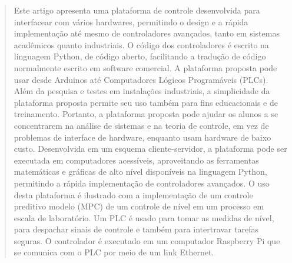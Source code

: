 \begin{quote}
    Este artigo apresenta uma plataforma de controle desenvolvida para
    interfacear com vários hardwares, permitindo o design e a rápida
    implementação até mesmo de controladores avançados, tanto em sistemas
    acadêmicos quanto industriais. O código dos controladores é escrito na
    linguagem Python, de código aberto, facilitando a tradução de código
    normalmente escrito em software comercial. A plataforma proposta pode usar
    desde Arduinos até Computadores Lógicos Programáveis ​​(PLCs). Além da
    pesquisa e testes em instalações industriais, a simplicidade da plataforma
    proposta permite seu uso também para fins educacionais e de treinamento.
    Portanto, a plataforma proposta pode ajudar os alunos a se concentrarem na
    análise de sistemas e na teoria de controle, em vez de problemas de
    interface de hardware, enquanto usam hardware de baixo custo. Desenvolvida
    em um esquema cliente-servidor, a plataforma pode ser executada em
    computadores acessíveis, aproveitando as ferramentas matemáticas e gráficas
    de alto nível disponíveis na linguagem Python, permitindo a rápida
    implementação de controladores avançados. O uso desta plataforma é ilustrado
    com a implementação de um controle preditivo modelo (MPC) de um controle de
    nível em um processo em escala de laboratório. Um PLC é usado para tomar as
    medidas de nível, para despachar sinais de controle e também para
    intertravar tarefas seguras. O controlador é executado em um computador
    Raspberry Pi que se comunica com o PLC por meio de um link Ethernet.
\end{quote}
